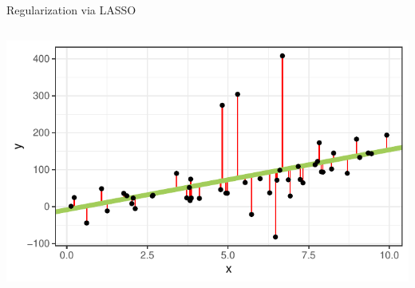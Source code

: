 \documentclass[10pt,compress,t,notes=noshow, xcolor=table]{beamer}
\begin{document}
\begin{frame}{Regularization via LASSO }
\begin{columns}[T, totalwidth=\textwidth]
\begin{column}{0.4\textwidth}
\centerline{\includegraphics[width=.8\textwidth]{figure/lm_example}} 
\end{column}
\end{columns}

\end{frame}
\end{document}
